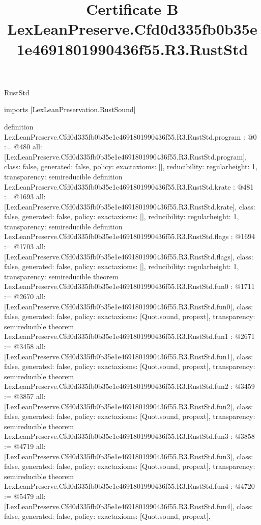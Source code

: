\begin{lexlean}{RustStd}
\title{Certificate B LexLeanPreserve.Cfd0d335fb0b35e1e4691801990436f55.R3.RustStd}
\begin{coremodule}
imports [LexLeanPreservation.RustSound]

definition LexLeanPreserve.Cfd0d335fb0b35e1e4691801990436f55.R3.RustStd.program : @0 := @480 {
  all: [LexLeanPreserve.Cfd0d335fb0b35e1e4691801990436f55.R3.RustStd.program],
  class: false,
  generated: false,
  policy: exact{axioms: []},
  reducibility: regular{height: 1},
  transparency: semireducible
}
definition LexLeanPreserve.Cfd0d335fb0b35e1e4691801990436f55.R3.RustStd.krate : @481 := @1693 {
  all: [LexLeanPreserve.Cfd0d335fb0b35e1e4691801990436f55.R3.RustStd.krate],
  class: false,
  generated: false,
  policy: exact{axioms: []},
  reducibility: regular{height: 1},
  transparency: semireducible
}
definition LexLeanPreserve.Cfd0d335fb0b35e1e4691801990436f55.R3.RustStd.flags : @1694 := @1703 {
  all: [LexLeanPreserve.Cfd0d335fb0b35e1e4691801990436f55.R3.RustStd.flags],
  class: false,
  generated: false,
  policy: exact{axioms: []},
  reducibility: regular{height: 1},
  transparency: semireducible
}
theorem LexLeanPreserve.Cfd0d335fb0b35e1e4691801990436f55.R3.RustStd.fun0 : @1711 := @2670 {
  all: [LexLeanPreserve.Cfd0d335fb0b35e1e4691801990436f55.R3.RustStd.fun0],
  class: false,
  generated: false,
  policy: exact{axioms: [Quot.sound, propext]},
  transparency: semireducible
}
theorem LexLeanPreserve.Cfd0d335fb0b35e1e4691801990436f55.R3.RustStd.fun1 : @2671 := @3458 {
  all: [LexLeanPreserve.Cfd0d335fb0b35e1e4691801990436f55.R3.RustStd.fun1],
  class: false,
  generated: false,
  policy: exact{axioms: [Quot.sound, propext]},
  transparency: semireducible
}
theorem LexLeanPreserve.Cfd0d335fb0b35e1e4691801990436f55.R3.RustStd.fun2 : @3459 := @3857 {
  all: [LexLeanPreserve.Cfd0d335fb0b35e1e4691801990436f55.R3.RustStd.fun2],
  class: false,
  generated: false,
  policy: exact{axioms: [Quot.sound, propext]},
  transparency: semireducible
}
theorem LexLeanPreserve.Cfd0d335fb0b35e1e4691801990436f55.R3.RustStd.fun3 : @3858 := @4719 {
  all: [LexLeanPreserve.Cfd0d335fb0b35e1e4691801990436f55.R3.RustStd.fun3],
  class: false,
  generated: false,
  policy: exact{axioms: [Quot.sound, propext]},
  transparency: semireducible
}
theorem LexLeanPreserve.Cfd0d335fb0b35e1e4691801990436f55.R3.RustStd.fun4 : @4720 := @5479 {
  all: [LexLeanPreserve.Cfd0d335fb0b35e1e4691801990436f55.R3.RustStd.fun4],
  class: false,
  generated: false,
  policy: exact{axioms: [Quot.sound, propext]},
}
\end{coremodule}
\end{lexlean}
